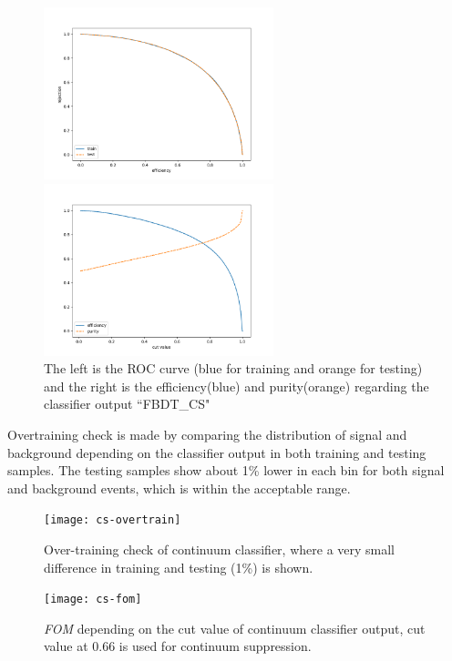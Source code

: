 \begin{figure}[ht]
	\begin{minipage}[b]{0.5\linewidth}
		\centering 
		\includegraphics[height=5cm]{figures/ROC_CS}	
	\end{minipage}
	\begin{minipage}[b]{0.5\linewidth}
		\centering 
		\includegraphics[height=5cm]{figures/eff_CS}	
	\end{minipage}
\caption{The left is the ROC curve (blue for training and orange for testing)
	and the right is the efficiency(blue) and purity(orange) regarding the classifier output ``FBDT\_CS"}
	\label{fig:cs_roc}
\end{figure}
Overtraining check is made by comparing the distribution of signal and background depending on the classifier output in both training and testing samples. The testing samples show about 1\% lower in each bin for both signal and background events, which is within the acceptable range.  
\begin{figure}[H]
	\centering
	\texttt{[image: cs-overtrain]}
	\caption{Over-training check of continuum classifier, where a very small difference in training and testing (1\%) is shown.}
\end{figure}

\begin{figure}[H]
	\centering
	\texttt{[image: cs-fom]}
	\caption{\textit{FOM} depending on the cut value of continuum classifier output, cut value at 0.66 is used for continuum suppression. }
	\label{fig:cs_fom}
\end{figure}

